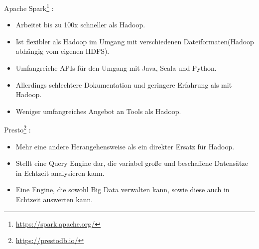 \documentclass[paper=a4, fontsize=11pt]{scrartcl}
\begin{document}
Apache Spark\footnote{\url{https://spark.apache.org/}} :
\begin{itemize}
\item Arbeitet bis zu 100x schneller als Hadoop. 
\item Ist flexibler als Hadoop im Umgang mit verschiedenen Dateiformaten(Hadoop abh\"angig vom eigenen HDFS).
\item Umfangreiche APIs f\"ur den Umgang mit Java, Scala und Python.
\item Allerdings schlechtere Dokumentation und geringere Erfahrung als mit Hadoop.
\item Weniger umfangreiches Angebot an Tools als Hadoop.
\end{itemize}

Presto\footnote{\url{https://prestodb.io/}} :
\begin{itemize}
\item Mehr eine andere Herangehensweise als ein direkter Ersatz f\"ur Hadoop.
\item Stellt eine Query Engine dar, die variabel gro\ss{}e und beschaffene Datens\"atze in Echtzeit analysieren kann.
\item Eine Engine, die sowohl Big Data verwalten kann, sowie diese auch in Echtzeit auswerten kann.
\end{itemize}
\end{document}
